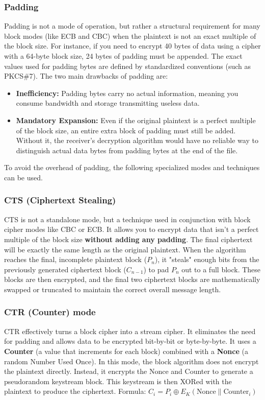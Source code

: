 \subsubsection{Padding}
Padding is not a mode of operation, but rather a structural requirement for many block modes (like ECB and CBC) when the plaintext is not an exact multiple of the block size. For instance, if you need to encrypt 40 bytes of data using a cipher with a 64-byte block size, 24 bytes of padding must be appended.
The exact values used for padding bytes are defined by standardized conventions (such as PKCS\#7).
The two main drawbacks of padding are:
\begin{itemize}
    \item \textbf{Inefficiency:} Padding bytes carry no actual information, meaning you consume bandwidth and storage transmitting useless data.
    \item \textbf{Mandatory Expansion:} Even if the original plaintext is a perfect multiple of the block size, an entire extra block of padding must still be added. Without it, the receiver's decryption algorithm would have no reliable way to distinguish actual data bytes from padding bytes at the end of the file.
\end{itemize}
To avoid the overhead of padding, the following specialized modes and techniques can be used.

\subsubsection{CTS (Ciphertext Stealing)}
CTS is not a standalone mode, but a technique used in conjunction with block cipher modes like CBC or ECB. It allows you to encrypt data that isn't a perfect multiple of the block size \textbf{without adding any padding}. The final ciphertext will be exactly the same length as the original plaintext.
When the algorithm reaches the final, incomplete plaintext block ($P_n$), it "steals" enough bits from the previously generated ciphertext block ($C_{n-1}$) to pad $P_n$ out to a full block. These blocks are then encrypted, and the final two ciphertext blocks are mathematically swapped or truncated to maintain the correct overall message length.

\subsubsection{CTR (Counter) mode}
CTR effectively turns a block cipher into a stream cipher. It eliminates the need for padding and allows data to be encrypted bit-by-bit or byte-by-byte. It uses a \textbf{Counter} (a value that increments for each block) combined with a \textbf{Nonce} (a random Number Used Once).
In this mode, the block algorithm does not encrypt the plaintext directly. Instead, it encrypts the Nonce and Counter to generate a pseudorandom keystream block. This keystream is then XORed with the plaintext to produce the ciphertext.
Formula: $C_i = P_i \oplus E_K(\text{Nonce} \parallel \text{Counter}_i)$

